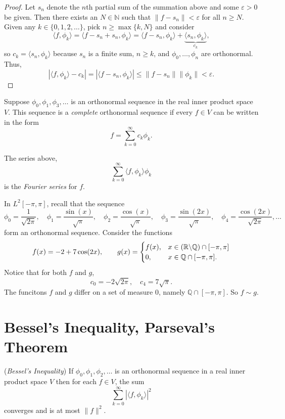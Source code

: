 \documentclass[11pt]{article}
\theoremstyle{definition}
\newcommand{\R}{\mathbb{R}}                      %
\newcommand{\Q}{\mathbb{Q}}
\newcommand{\N}{\mathbb{N}}
\newcommand{\bslash}{\symbol{92}}
\begin{document}
\begin{proof}
    Let $s_n$ denote the $n$th partial sum of the summation above and some $\varepsilon>0$ be given. Then there exists an $N\in\N$ such that $\|f-s_n\|<\varepsilon$ for all $n\geq N$. Given any $k\in \{0,1,2,\dots\}$, pick $n\geq \max \{k,N\}$ and consider
    $$
    \langle f,\phi_k\rangle = \langle f-s_n+s_n,\phi_k\rangle = \langle f-s_n,\phi_k\rangle +\underbrace{\langle s_n,\phi_k\rangle}_{c_k},
    $$
    so $c_k=\langle s_n,\phi_k\rangle$ because $s_n$ is a finite sum, $n\geq k$, and $\phi_0,\dots,\phi_n$ are orthonormal. Thus,
    $$
    |\langle f, \phi_k\rangle  -c_k| = |\langle f-s_n,\phi_k\rangle|\leq \|f-s_n\|\|\phi_k\|<\varepsilon.
    $$
\end{proof}
\begin{mdframed}[backgroundcolor = blue!10]
\vspace{+0.1cm}
 Suppose $\phi_0,\phi_1,\phi_3,\dots$ is an orthonormal sequence in the real inner product space $V$. This sequence is a \textit{complete} orthonormal sequence if every $f\in V$ can be written in the form 
$$
f=\sum_{k=0}^\infty c_k\phi_k.
$$

 The series above,
$$
\sum_{k=0}^\infty \langle f,\phi_k\rangle \phi_k
$$
is the \textit{Fourier series} for $f$.
\end{mdframed}
\ex In $L^2[-\pi,\pi]$, recall that the sequence
$$
\phi_0 = \frac{1}{\sqrt{2\pi}},\quad \phi_1=\frac{\sin(x)}{\sqrt{\pi}},\quad \phi_2 = \frac{\cos(x)}{\sqrt{\pi}},\quad\phi_3=\frac{\sin(2x)}{\sqrt{\pi}},\quad \phi_4=\frac{\cos(2x)}{\sqrt{2\pi}},\dots
$$
form an orthonormal sequence. Consider the functions
$$
f(x) = -2+7\cos(2x),\qquad g(x) =\begin{cases}
f(x), &x\in(\R\bslash \Q)\cap [-\pi,\pi]\\
0, &x\in\Q\cap[-\pi,\pi].
\end{cases}
$$
Notice that for both $f$ and $g$,
$$
c_0=-2\sqrt{2\pi},\quad c_4 = 7\sqrt{\pi}.
$$
The funcitons $f$ and $g$ differ on a set of measure 0, namely $\Q\cap[-\pi,\pi]$. So $f\sim g$.

\section{Bessel's Inequality, Parseval's Theorem}

\prop (\textit{Bessel's Inequality}) If $\phi_0,\phi_1,\phi_2,\dots$ is an orthonormal sequence in a real inner product space $V$ then for each $f\in V$, the sum
$$
\sum_{k=0}^\infty |\langle f,\phi_k\rangle |^2
$$
converges and is at most $\|f\|^2$.
\end{document}
